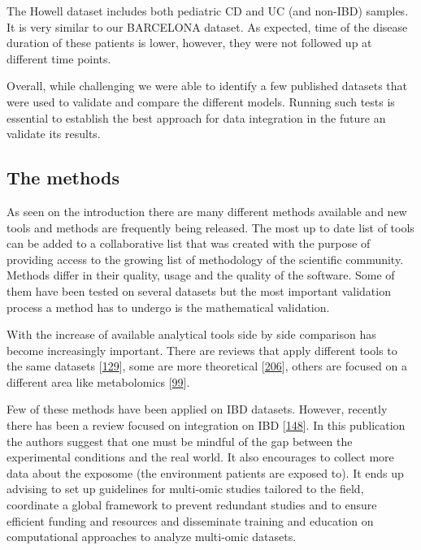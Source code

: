 \documentclass[
  12pt,
  a4paper,
  twoside,
  openright]{book}
\begin{document}
The Howell dataset includes both pediatric CD and UC (and non-IBD) samples.
It is very similar to our BARCELONA dataset.
As expected, time of the disease duration of these patients is lower, however, they were not followed up at different time points.

Overall, while challenging we were able to identify a few published datasets that were used to validate and compare the different models.
Running such tests is essential to establish the best approach for data integration in the future an validate its results.

\hypertarget{the-methods}{%
\subsection{The methods}\label{the-methods}}

As seen on the introduction there are many different methods available and new tools and methods are frequently being released.
The most up to date list of tools can be added to a collaborative list that was created with the purpose of providing access to the growing list of methodology of the scientific community.
Methods differ in their quality, usage and the quality of the software.
Some of them have been tested on several datasets but the most important validation process a method has to undergo is the mathematical validation.

With the increase of available analytical tools side by side comparison has become increasingly important.
There are reviews that apply different tools to the same datasets {[}\protect\hyperlink{ref-cantini2021}{129}{]}, some are more theoretical {[}\protect\hyperlink{ref-bersanelli2016}{206}{]}, others are focused on a different area like metabolomics {[}\protect\hyperlink{ref-cavill2016}{99}{]}.

Few of these methods have been applied on IBD datasets.
However, recently there has been a review focused on integration on IBD {[}\protect\hyperlink{ref-sudhakar2022}{148}{]}.
In this publication the authors suggest that one must be mindful of the gap between the experimental conditions and the real world.
It also encourages to collect more data about the exposome (the environment patients are exposed to).
It ends up advising to set up guidelines for multi-omic studies tailored to the field, coordinate a global framework to prevent redundant studies and to ensure efficient funding and resources and disseminate training and education on computational approaches to analyze multi-omic datasets.
\end{document}
